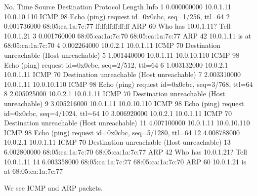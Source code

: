 No.     Time           Source                Destination           Protocol Length Info
      1 0.000000000    10.0.1.11             10.0.10.110           ICMP     98     Echo (ping) request  id=0x0cbc, seq=1/256, ttl=64
      2 0.001736000    68:05:ca:1a:7c:77     ff:ff:ff:ff:ff:ff     ARP      60     Who has 10.0.1.11?  Tell 10.0.1.21
      3 0.001760000    68:05:ca:1a:7c:70     68:05:ca:1a:7c:77     ARP      42     10.0.1.11 is at 68:05:ca:1a:7c:70
      4 0.002264000    10.0.2.1              10.0.1.11             ICMP     70     Destination unreachable (Host unreachable)
      5 1.001440000    10.0.1.11             10.0.10.110           ICMP     98     Echo (ping) request  id=0x0cbc, seq=2/512, ttl=64
      6 1.003132000    10.0.2.1              10.0.1.11             ICMP     70     Destination unreachable (Host unreachable)
      7 2.003310000    10.0.1.11             10.0.10.110           ICMP     98     Echo (ping) request  id=0x0cbc, seq=3/768, ttl=64
      8 2.005025000    10.0.2.1              10.0.1.11             ICMP     70     Destination unreachable (Host unreachable)
      9 3.005216000    10.0.1.11             10.0.10.110           ICMP     98     Echo (ping) request  id=0x0cbc, seq=4/1024, ttl=64
     10 3.006920000    10.0.2.1              10.0.1.11             ICMP     70     Destination unreachable (Host unreachable)
     11 4.007100000    10.0.1.11             10.0.10.110           ICMP     98     Echo (ping) request  id=0x0cbc, seq=5/1280, ttl=64
     12 4.008788000    10.0.2.1              10.0.1.11             ICMP     70     Destination unreachable (Host unreachable)
     13 6.002800000    68:05:ca:1a:7c:70     68:05:ca:1a:7c:77     ARP      42     Who has 10.0.1.21?  Tell 10.0.1.11
     14 6.003358000    68:05:ca:1a:7c:77     68:05:ca:1a:7c:70     ARP      60     10.0.1.21 is at 68:05:ca:1a:7c:77

We see ICMP and ARP packets.